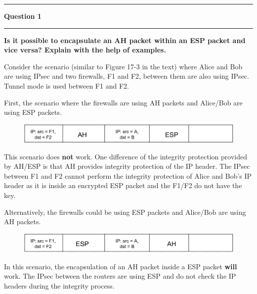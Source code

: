 \documentclass[11pt]{article}
\newcommand\question[2]{\vspace{.25in}\hrule\textbf{#1}\vspace{.5em}\hrule\vspace{.10in}}
\renewcommand\part[1]{\vspace{.10in}\textbf{(#1)}}
\begin{document}
\raggedright
\newcommand\NAME{Jake Pitkin}  %
\newcommand\UID{u0891770}     %
\newcommand\HWNUM{5}              %

\question{Question 1}

\part{a} \textbf{Is it possible to encapsulate an AH packet within an ESP packet and vice versa? Explain with the help of examples.}

Consider the scenario (similar to Figure 17-3 in the text) where Alice and Bob are using IPsec and two firewalls, F1 and F2, between them are also using IPsec. Tunnel mode is used between F1 and F2.

First, the scenario where the firewalls are using AH packets and Alice/Bob are using ESP packets.

\begin{figure}[H]
  \centerline{\includegraphics[width=0.5\linewidth]{hw5_1b_1.png}}
\end{figure}

This scenario does \textbf{not} work. One difference of the integrity protection provided by AH/ESP is that AH provides integrity protection of the IP header. The IPsec between F1 and F2 cannot perform the integrity protection of Alice and Bob's IP header as it is inside an encrypted ESP packet and the F1/F2 do not have the key.

Alternatively, the firewalls could be using ESP packets and Alice/Bob are using AH packets.

\begin{figure}[H]
  \centerline{\includegraphics[width=0.5\linewidth]{hw5_1b_2.png}}
\end{figure}

In this scenario, the encapsulation of an AH packet inside a ESP packet \textbf{will} work. The IPsec between the routers are using ESP and do not check the IP headers during the integrity process.
\end{document}
